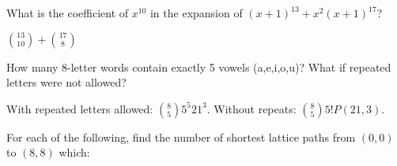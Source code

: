 \begin{questions}
\question What is the coefficient of $x^{10}$ in the expansion of $(x+1)^{13} + x^2(x+1)^{17}$?

	\begin{answer}
		${13 \choose 10} + {17 \choose 8}$
	\end{answer}
	
	


\question How many 8-letter words contain exactly 5 vowels (a,e,i,o,u)?  What if repeated letters were not allowed?

	\begin{answer}
		 With repeated letters allowed: ${8 \choose 5}5^5 21^3$.  Without repeats: ${8 \choose 5}5! P(21, 3)$.
	\end{answer}
	
	


\question For each of the following, find the number of shortest lattice paths from $(0,0)$ to $(8,8)$ which:

	\begin{answer}
	\end{answer}
	

\end{questions}
